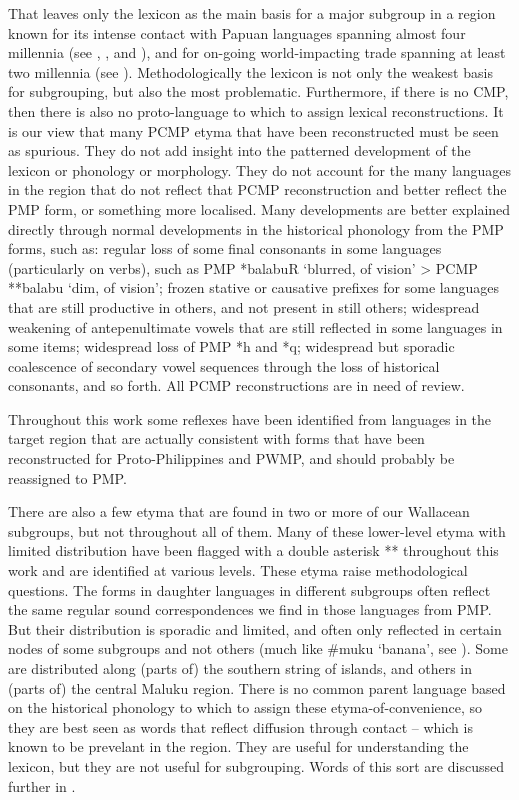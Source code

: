 \newpage
\largerpage
That leaves only the lexicon as the main basis for a major subgroup
in a region known for its intense contact with Papuan languages
spanning almost four millennia (see , , and ),
and for on-going world-impacting trade spanning
at least two millennia (see ).
Methodologically the lexicon is not only the weakest basis for
subgrouping, but also the most problematic.
Furthermore, if there is no CMP,
then there is also no proto-language to which to assign lexical reconstructions.
It is our view that many PCMP etyma that have been reconstructed
must be seen as spurious.
They do not add insight into the patterned development of the
lexicon or phonology or morphology.
They do not account for the many languages in the region that
do not reflect that PCMP reconstruction
and better reflect the PMP form,
or something more localised.
Many developments are better explained directly through normal
developments in the historical phonology from the PMP forms,
such as: regular loss of some final consonants in some languages
(particularly on verbs), such as PMP *balabuR ‘blurred,
of vision’ > PCMP **balabu ‘dim,
of vision’; frozen stative or causative prefixes for some languages
that are still productive in others,
and not present in still others; widespread weakening of antepenultimate
vowels that are still reflected in some languages in some items;
widespread loss of PMP *h
and *q; widespread but sporadic coalescence of secondary vowel
sequences through the loss of historical consonants, and so forth.
All PCMP reconstructions are in need of review.

Throughout this work some reflexes have been identified from
languages in the target region that are actually consistent with
forms that have been reconstructed for Proto-Philippines
and PWMP, and should probably be reassigned to PMP.

There are also a few etyma that are found in two or more of our
Wallacean subgroups, but not throughout all of them.
Many of these lower-level etyma with limited distribution have
been flagged with a double asterisk ** throughout this work
and are identified at various levels.
These etyma raise methodological questions.
The forms in daughter languages in different subgroups often
reflect the same regular sound correspondences we find in those languages from PMP.
But their distribution is sporadic
and limited, and often only reflected in certain nodes of some
subgroups and not others (much like {\#}muku ‘banana’, see ).
Some are distributed along (parts of) the southern string of
islands, and others in (parts of) the central Maluku region.
There is no common parent language based on the historical phonology
to which to assign these etyma-of-convenience,
so they are best seen as words that reflect diffusion through
contact -- which is known to be prevelant in the region.
They are useful for understanding the lexicon,
but they are not useful for subgrouping.
Words of this sort are discussed further in .
